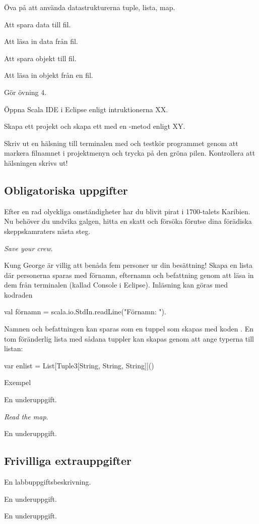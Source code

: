 
\Lab{\LabWeekFOUR}

\begin{Goals}
\item {\"O}va p{\aa} att anv{\"a}nda datastrukturerna tuple, lista, map.
\item Att spara data till fil.
\item Att l{\"a}sa in data fr{\aa}n fil.
\item Att spara objekt till fil.
\item Att l{\"a}sa in objekt fr{\aa}n en fil.
\end{Goals}

\begin{Preparations}
\item G{\"o}r {\"o}vning 4. %
\item {\"O}ppna Scala IDE i Eclipse enligt intruktionerna XX.
\item Skapa ett projekt och skapa ett  med en -metod enligt XY.
\item Skriv ut en h{\"a}lsning till terminalen med  och testk{\"o}r programmet genom att markera filnamnet i projektmenyn och trycka p{\aa} den gr{\"o}na pilen. Kontrollera att h{\"a}lsningen skrivs ut!
\end{Preparations}

\subsection{Obligatoriska uppgifter}
Efter en rad olyckliga omständigheter har du blivit pirat i 1700-talets Karibien. Nu beh{\"o}ver du undvika galgen, hitta en skatt och f{\"o}rs{\"o}ka f{\"o}rutse dina f{\"o}r{\"a}diska skeppskamraters n{\"a}sta steg.

\Task \emph{Save your crew}. 

\Subtask Kung George {\"a}r villig att ben{\aa}da fem personer ur din bes{\"a}ttning! Skapa en lista d{\"a}r personerna sparas med f{\"o}rnamn, efternamn och befattning genom att l{\"a}sa in dem fr{\aa}n terminalen (kallad Console i Eclipse). Inl{\"a}sning kan g{\"o}ras med kodraden 
\begin{Code}
val förnamn = scala.io.StdIn.readLine("Förnamn: "). 
\end{Code}
Namnen och befattningen kan sparas som en tuppel som skapas med koden . En tom f{\"o}r{\"a}nderlig lista med s{\aa}dana tuppler kan skapas genom att ange typerna till listan: 
\begin{Code}
var enlist = List[Tuple3[String, String, String]]()
\end{Code}
 Exempel 

\Subtask En underuppgift.


\Task \emph{Read the map}. 

\Subtask En underuppgift.

\subsection{Frivilliga extrauppgifter}

\Task En labbuppgiftsbeskrivning.

\Subtask En underuppgift.

\Subtask En underuppgift.
    
